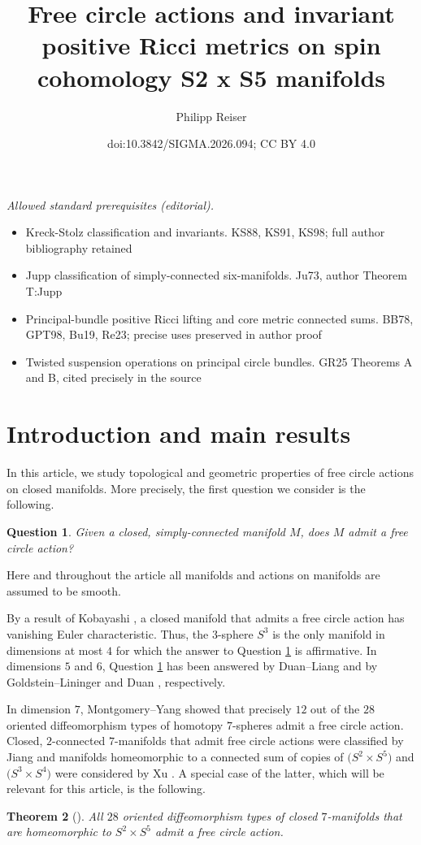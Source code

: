 \documentclass[10pt,a4paper]{amsart}
\title{Free circle actions and invariant positive Ricci metrics on spin cohomology S2 x S5 manifolds}
\author{Philipp Reiser}
\date{doi:10.3842/SIGMA.2026.094; CC BY 4.0}
\numberwithin{equation}{section}
\newtheorem{Theorem}{Theorem}[section]
\newtheorem{Question}[Theorem]{Question}
\theoremstyle{definition}
\numberwithin{table}{section}
\begin{document}
\maketitle
\noindent\textit{Allowed standard prerequisites (editorial).}\begin{itemize}
\item Kreck-Stolz classification and invariants. KS88, KS91, KS98; full author bibliography retained
\item Jupp classification of simply-connected six-manifolds. Ju73, author Theorem T:Jupp
\item Principal-bundle positive Ricci lifting and core metric connected sums. BB78, GPT98, Bu19, Re23; precise uses preserved in author proof
\item Twisted suspension operations on principal circle bundles. GR25 Theorems A and B, cited precisely in the source
\end{itemize}\medskip
\section{Introduction and main results}

In this article, we study topological and geometric properties of free circle actions on closed manifolds. More precisely, the first question we consider is the following.
\begin{Question}\label{Q:free_circ_ex}
	Given a closed, simply-connected manifold $M$, does $M$ admit a free circle action?
\end{Question}
Here and throughout the article all manifolds and actions on manifolds are assumed to be smooth.

By a result of Kobayashi \cite{Ko58}, a closed manifold that admits a free circle action has vanishing Euler characteristic. Thus, the $3$-sphere $S^3$ is the only manifold in dimensions at most $4$ for which the answer to Question \ref{Q:free_circ_ex} is affirmative. In dimensions $5$ and $6$, Question \ref{Q:free_circ_ex} has been answered by Duan--Liang \cite{DL05} and by Goldstein--Lininger \cite{GL71} and Duan \cite{Du26}, respectively.

In dimension $7$, Montgomery--Yang \cite{MY68} showed that precisely $12$ out of the $28$ oriented diffeomorphism types of homotopy $7$-spheres admit a free circle action. Closed, $2$-connected $7$-manifolds that admit free circle actions were classified by Jiang \cite{Ji14} and manifolds homeomorphic to a connected sum of copies of $\bigl(S^2\times S^5\bigr)$ and $\bigl(S^3\times S^4\bigr)$ were considered by Xu \cite{Xu25}. A special case of the latter, which will be relevant for this article, is the following.
\begin{Theorem}[{\cite[Proposition 1]{Xu25}}]\label{T:S2xS5_hom}
	All $28$ oriented diffeomorphism types of closed $7$-manifolds that are homeomorphic to $S^2\times S^5$ admit a free circle action.
\end{Theorem}
\end{document}
